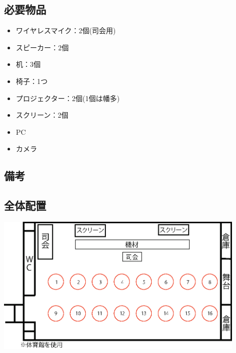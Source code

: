 \subsection{必要物品}
\begin{itemize}
  \item ワイヤレスマイク：2個(司会用)
  \item スピーカー：2個
  \item 机：3個
  \item 椅子：1つ
  \item プロジェクター：2個(1個は幡多)
  \item スクリーン：2個
  \item PC
  \item カメラ

\end{itemize}
\subsection{備考}

\subsection{全体配置}
\begin{center}
\includegraphics[width=12cm]{./21/reiout1.eps}
\label{fig:ice}

\end{center}
